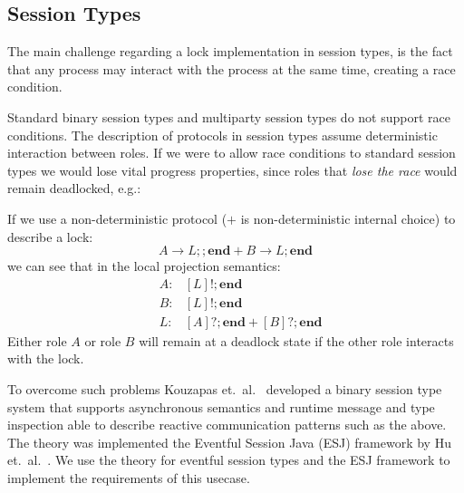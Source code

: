 \subsection{Session Types}

The main challenge regarding a lock implementation
in session types, is the fact that any process may
interact with the process at the same time, creating 
a race condition.

Standard binary session types and multiparty session types
do not support race conditions. The description of
protocols in session types assume deterministic interaction
between roles. If we were to allow race conditions to standard
session types we would lose vital progress properties, since
roles that {\em lose the race} would remain deadlocked, e.g.:

\newcommand{\val}[2]{\ensuremath{#1 \rightarrow #2;} }
\newcommand{\tinact}{\ensuremath{\mathbf{end}}}
\newcommand{\tout}[1]{\ensuremath{[#1]!;}}
\newcommand{\tinp}[1]{\ensuremath{[#1]?;}}

If we use a non-deterministic protocol ($+$ is non-deterministic internal choice)
to describe a lock:
\[
	\val{A}{L}; \tinact + \val{B}{L} \tinact
\]
we can see that in the local projection semantics:
\begin{eqnarray*}
	&A:& \tout{L} \tinact\\
	&B:& \tout{L} \tinact\\
	&L:& \tinp{A} \tinact + \tinp{B} \tinact
\end{eqnarray*}
Either role $A$ or role $B$ will remain at a deadlock state
if the other role interacts with the lock.


To overcome such problems Kouzapas et.~al.~\cite{citation_needed}
developed a binary session type system that supports asynchronous
semantics and runtime message and type inspection able to describe
reactive communication patterns such as the above. The theory
was implemented the Eventful Session Java (ESJ) framework
by Hu et.~al.~\cite{citation_needed}.
We use the theory for eventful session types and the ESJ framework
to implement the requirements of this usecase.
